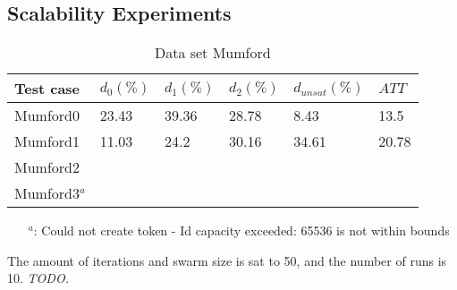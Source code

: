 \subsection{Scalability Experiments}
\label{subsec:scalabilityExperiments_results}




\begin{table}[H]
    \centering
    \hspace*{-1.0cm}
    \begin{tabular}{|l|l|l|l|l|l|}
        \hline
        Test case &  $d_0(\%)$ & $d_1(\%)$ & $d_2(\%)$ & $d_{unsat}(\%)$ & $ATT$\\
        \hline
        Mumford0 & 23.43 & 39.36 & 28.78 & 8.43 & 13.5\\
        Mumford1 & 11.03 & 24.2 & 30.16 & 34.61 & 20.78\\
        Mumford2 & &  & & &\\
        Mumford3$^a$  & & & &&\\
        \hline
    \end{tabular}
    \caption{Data set Mumford}
    \begin{itemize}[noitemsep]
    \item[$^a$:] Could not create token - Id capacity exceeded: 65536 is not within bounds
    \end{itemize}
    \label{table:dataSet_mumford}
\end{table}
The amount of iterations and swarm size is sat to 50, and the number of runs is 10. \emph{\color{blue} TODO.}